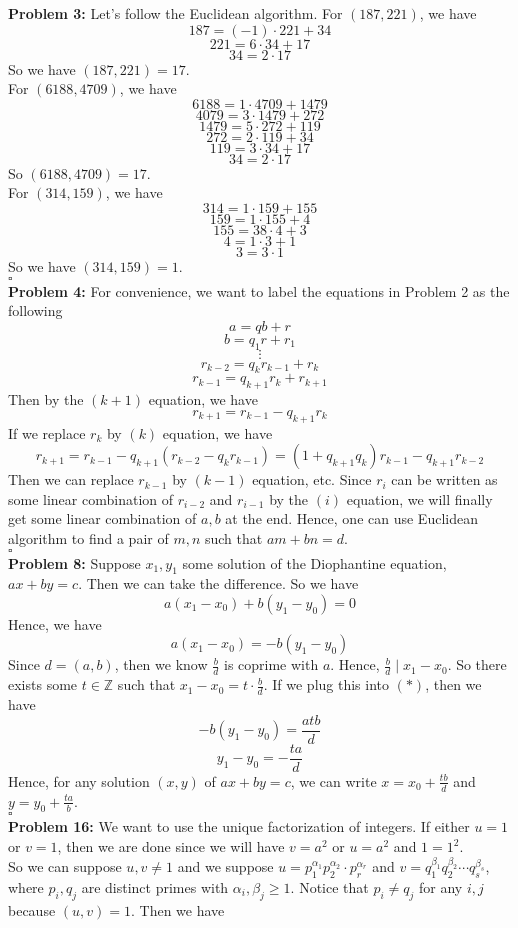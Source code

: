 \documentclass[12pt]{amsart}
\newcommand{\Z}{\mathbb{Z}}
\begin{document}
\textbf{Problem 3:}
Let's follow the Euclidean algorithm. For $(187,221)$, we have 
\[187=(-1)\cdot 221+34\]
\[221=6\cdot 34+17\]
\[34=2\cdot 17\]
So we have $(187,221)=17$.
\\For $(6188,4709)$, we have 
\[6188=1\cdot 4709+1479\]
\[4079=3\cdot 1479 + 272\]
\[1479=5\cdot 272+ 119\]
\[272=2\cdot 119+34\]
\[119=3\cdot 34+17\]
\[34=2\cdot 17\]
So $(6188,4709)=17$.\\
For $(314,159)$, we have 
\[314=1\cdot 159+155\]
\[159=1\cdot 155+4\]
\[155=38\cdot 4+3\]
\[4=1\cdot 3+1\]
\[3=3\cdot 1\]
So we have $(314,159)=1$.
\\\phantom{qed}\hfill$\square$\\
\textbf{Problem 4:} For convenience, we want to label the equations in Problem 2 as the following
\[a=qb+r\tag{0}\]
\[b=q_1r+r_1\tag{1}\]
\[\vdots\]
\[r_{k-2}=q_{k}r_{k-1}+r_{k}\tag{k}\]
\[r_{k-1}=q_{k+1}r_k+r_{k+1}\tag{k+1}\]
Then by the $(k+1)$ equation, we have 
\[r_{k+1}=r_{k-1}-q_{k+1}r_k\]
If we replace $r_k$ by $(k)$ equation, we have 
\[r_{k+1}=r_{k-1}-q_{k+1}(r_{k-2}-q_kr_{k-1})=(1+q_{k+1}q_k)r_{k-1}-q_{k+1}r_{k-2}\]
Then we can replace $r_{k-1}$ by $(k-1)$ equation, etc. Since $r_i$ can be written as some linear combination of $r_{i-2}$ and $r_{i-1}$ by the $(i)$ equation, we will finally get some linear combination of $a,b$ at the end. Hence, one can use Euclidean algorithm to find a pair of $m,n$ such that $am+bn=d$.
\\\phantom{qed}\hfill$\square$\\
\textbf{Problem 8:} Suppose $x_1,y_1$ some solution of the Diophantine equation, $ax+by=c$. Then we can take the difference. So we have 
\[a(x_1-x_0)+b(y_1-y_0)=0\]
Hence, we have 
\[a(x_1-x_0)=-b(y_1-y_0)\tag{$\ast$}\]
Since $d=(a,b)$, then we know $\frac{b}{d}$ is coprime with $a$. Hence, $\frac{b}{d}\mid x_1-x_0$. So there exists some $t\in \Z$ such that $x_1-x_0=t\cdot \frac{b}{d}$. If we plug this into $(\ast)$, then we have 
\[-b(y_1-y_0)=\frac{atb}{d}\]
\[y_1-y_0=-\frac{ta}{d}\]
Hence, for any solution $(x,y)$ of $ax+by=c$, we can write $x=x_0+\frac{tb}{d}$ and $y=y_0+\frac{ta}{b}$.
\\\phantom{qed}\hfill$\square$\\
\textbf{Problem 16:} We want to use the unique factorization of integers. If either $u=1$ or $v=1$, then we are done since we will have $v=a^2$ or $u=a^2$ and $1=1^2$.\\
So we can suppose $u,v\neq 1$ and we suppose $u=p_1^{\alpha_1}p_2^{\alpha_2}\cdot p_r^{\alpha_r}$ and $v=q_1^{\beta_1}q_2^{\beta_2}\cdots q_s^{\beta_s}$, where $p_i,q_j$ are distinct primes with $\alpha_i,\beta_j\geq 1$. Notice that $p_i\neq q_j$ for any $i,j$ because $(u,v)=1$. Then we have 
\end{document}
